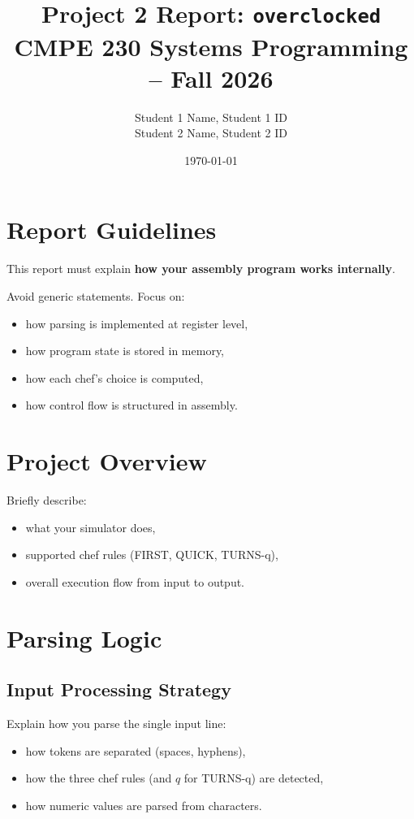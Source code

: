 \documentclass[a4paper,12pt]{article}
\title{Project 2 Report: \texttt{overclocked}\\
\large CMPE 230 Systems Programming -- Fall 2026}
\author{
Student 1 Name, Student 1 ID \\
Student 2 Name, Student 2 ID
}
\date{\today}
\begin{document}
\maketitle

\section*{Report Guidelines}

This report must explain \textbf{how your assembly program works internally}.

Avoid generic statements. Focus on:
\begin{itemize}
\item how parsing is implemented at register level,
\item how program state is stored in memory,
\item how each chef's choice is computed,
\item how control flow is structured in assembly.
\end{itemize}


\section{Project Overview}

Briefly describe:
\begin{itemize}
\item what your simulator does,
\item supported chef rules (FIRST, QUICK, TURNS-q),
\item overall execution flow from input to output.
\end{itemize}


\section{Parsing Logic}

\subsection{Input Processing Strategy}

Explain how you parse the single input line:

\begin{itemize}
\item how tokens are separated (spaces, hyphens),
\item how the three chef rules (and $q$ for TURNS-q) are detected,
\item how numeric values are parsed from characters.
\end{itemize}
\end{document}
